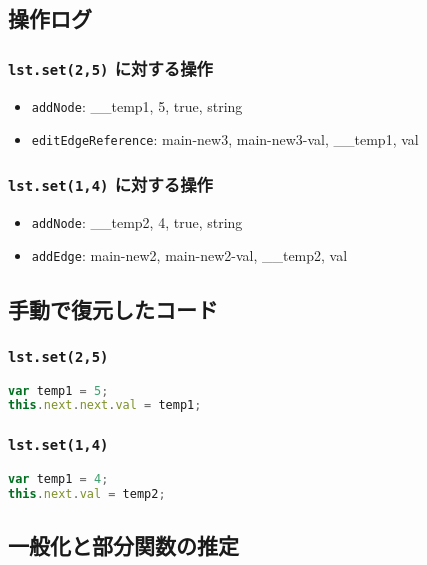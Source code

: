 \documentclass{article}
\begin{document}
\subsection{操作ログ}

\subsubsection{\texttt{lst.set(2,5)} に対する操作}
\begin{itemize}
  \item \texttt{addNode}: \_\_temp1, 5, true, string
  \item \texttt{editEdgeReference}: main-new3, main-new3-val, \_\_temp1, val
\end{itemize}

\subsubsection{\texttt{lst.set(1,4)} に対する操作}
\begin{itemize}
  \item \texttt{addNode}: \_\_temp2, 4, true, string
  \item \texttt{addEdge}: main-new2, main-new2-val, \_\_temp2, val
\end{itemize}

\subsection{手動で復元したコード}

\subsubsection{\texttt{lst.set(2,5)}}
\begin{lstlisting}[language=JavaScript]
var temp1 = 5;
this.next.next.val = temp1;
\end{lstlisting}

\subsubsection{\texttt{lst.set(1,4)}}
\begin{lstlisting}[language=JavaScript]
var temp1 = 4;
this.next.val = temp2;
\end{lstlisting}

\subsection{一般化と部分関数の推定}
\end{document}
